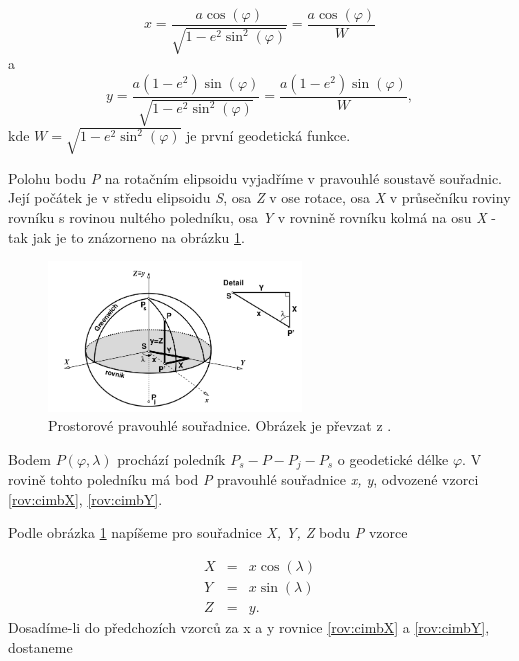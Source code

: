 \documentclass[11pt,a4paper]{article}
\begin{document}
\begin{equation}
x =\dfrac{a\cos{\left(\varphi\right)}}{\sqrt{1-e^{2}\sin^{2}{\left(\varphi\right)}}} = \dfrac{a\cos{\left(\varphi\right)}}{W}
\label{rov:cimbX}
\end{equation}
a
\begin{equation}
y =\dfrac{a\left(1-e^{2}\right)\sin{\left(\varphi\right)}}{\sqrt{1-e^{2}\sin^{2}{\left(\varphi\right)}}} = \dfrac{a\left(1-e^{2}\right)\sin{\left(\varphi\right)}}{W},
\label{rov:cimbY}
\end{equation}
kde 
$W = \sqrt{1-e^{2}\sin^{2}{\left(\varphi\right)}}$ je první geodetická funkce.

Polohu bodu \textit{P} na rotačním elipsoidu vyjadříme v pravouhlé soustavě souřadnic. Její počátek je v středu elipsoidu \textit{S}, osa \textit{Z} v ose rotace, osa \textit{X} v průsečníku roviny rovníku s rovinou nultého poledníku, osa \textit{Y} v rovnině rovníku kolmá na osu \textit{X} - tak jak je to znázorneno na obrázku \ref{fig:cim116}.

\begin{figure}[ht!]
\begin{center}

\includegraphics[width=0.60\textwidth]{FIG/CimbalnikObr1-16}
\caption{Prostorové pravouhlé souřadnice. Obrázek je převzat z \cite{Cimbalnik1997}.}
\label{fig:cim116}
\end{center}
\end{figure}

Bodem $P\left(\varphi, \lambda\right)$ prochází poledník $P_{s}-P-P_{j}-P_{s}$ o geodetické délke $\varphi$. V rovině tohto poledníku má bod \textit{P} pravouhlé souřadnice \textit{x, y}, odvozené vzorci \ref{rov:cimbX}, \ref{rov:cimbY}.

Podle obrázka \ref{fig:cim116} napíšeme pro souřadnice \textit{X, Y, Z} bodu \textit{P} vzorce

\begin{eqnarray}
X &=& x\cos{\left(\lambda\right)} \\
Y &=& x\sin{\left(\lambda\right)} \\
Z &=& y. 
\end{eqnarray}
Dosadíme-li do předchozích vzorců za x a y rovnice \ref{rov:cimbX} a \ref{rov:cimbY}, dostaneme
\end{document}
